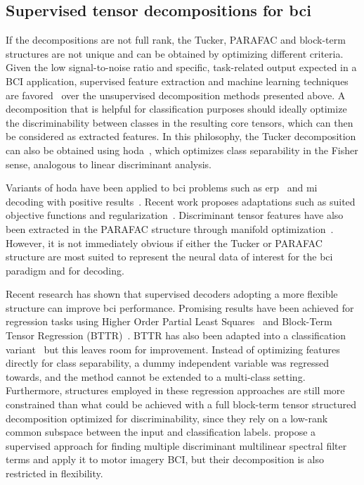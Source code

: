 \documentclass[10pt]{iopart}
\begin{document}
\subsection{Supervised tensor decompositions for \ac{bci}}

If the decompositions are not full rank, the Tucker, PARAFAC and block-term
structures are not unique and can be obtained by optimizing different criteria.
Given the low signal-to-noise ratio and specific, task-related output expected
in a BCI application, supervised feature extraction and machine learning techniques are
favored~\cite{Lotte2018} over the unsupervised decomposition methods presented
above.
A decomposition that is helpful for classification purposes should ideally optimize
the discriminability between classes in the resulting core tensors, which can
then be considered as extracted features.
In this philosophy, the Tucker decomposition can also be obtained
using \ac{hoda}~\cite{Yan2005,Phan2010,Froelich2018}, which optimizes class separability in the Fisher sense, analogous to linear
discriminant analysis.

Variants of \ac{hoda} have been applied to \ac{bci} problems such as
\ac{erp}~\cite{Onishi2012,Higashi2016} and \ac{mi}~\cite{Liu2015,Cai2021}
decoding with positive results~\cite{Lotte2018}.
Recent work proposes adaptations such as suited objective
functions and regularization~\cite{JamshidiIdaji2017,Jorajuria2022,Aghili2023}.
Discriminant tensor features have also been extracted
in the PARAFAC structure through manifold optimization~\cite{Froelich2018}.
However, it is not immediately obvious if either the Tucker or PARAFAC
structure are most suited to represent the neural data of interest for the
\ac{bci}
paradigm and for decoding.

Recent research has shown that supervised decoders adopting a more flexible structure
can improve \ac{bci} performance.
Promising results have been achieved for regression tasks using
Higher Order Partial Least Squares~\cite{Camarrone2018} and Block-Term Tensor
Regression (BTTR)~\cite{Faes2022,Faes2022a}.
BTTR has also been adapted into a classification variant~\cite{Camarrone2021}
but this leaves room for improvement.
Instead of optimizing features directly for class separability, a dummy
independent variable was regressed towards, and the method
cannot be extended to a multi-class setting.
Furthermore, structures employed in these regression approaches are still more constrained
than what could be achieved with a full block-term tensor structured decomposition
optimized for discriminability, since they rely on a low-rank common subspace
between the input and classification labels.
\textcite{Huang2020} propose a supervised approach for finding multiple discriminant
multilinear spectral filter terms and apply it to motor imagery BCI, but their
decomposition is also restricted in flexibility.
\end{document}
